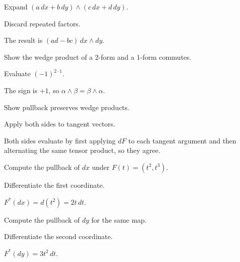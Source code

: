 \begin{exercise}\label{exr:vii09-06}
Expand \((a\,dx+b\,dy)\wedge(c\,dx+d\,dy)\).
\end{exercise}
\begin{hint}
Discard repeated factors.
\end{hint}
\begin{solution}
The result is \((ad-bc)\,dx\wedge dy\).
\end{solution}

\begin{exercise}\label{exr:vii09-07}
Show the wedge product of a \(2\)-form and a \(1\)-form commutes.
\end{exercise}
\begin{hint}
Evaluate \((-1)^{2\cdot1}\).
\end{hint}
\begin{solution}
The sign is \(+1\), so \(\alpha\wedge\beta=\beta\wedge\alpha\).
\end{solution}

\begin{exercise}\label{exr:vii09-08}
Show pullback preserves wedge products.
\end{exercise}
\begin{hint}
Apply both sides to tangent vectors.
\end{hint}
\begin{solution}
Both sides evaluate by first applying \(dF\) to each tangent argument and then alternating the same tensor product, so they agree.
\end{solution}

\begin{exercise}\label{exr:vii09-09}
Compute the pullback of \(dx\) under \(F(t)=(t^2,t^3)\).
\end{exercise}
\begin{hint}
Differentiate the first coordinate.
\end{hint}
\begin{solution}
\(F^*(dx)=d(t^2)=2t\,dt\).
\end{solution}

\begin{exercise}\label{exr:vii09-10}
Compute the pullback of \(dy\) for the same map.
\end{exercise}
\begin{hint}
Differentiate the second coordinate.
\end{hint}
\begin{solution}
\(F^*(dy)=3t^2\,dt\).
\end{solution}

